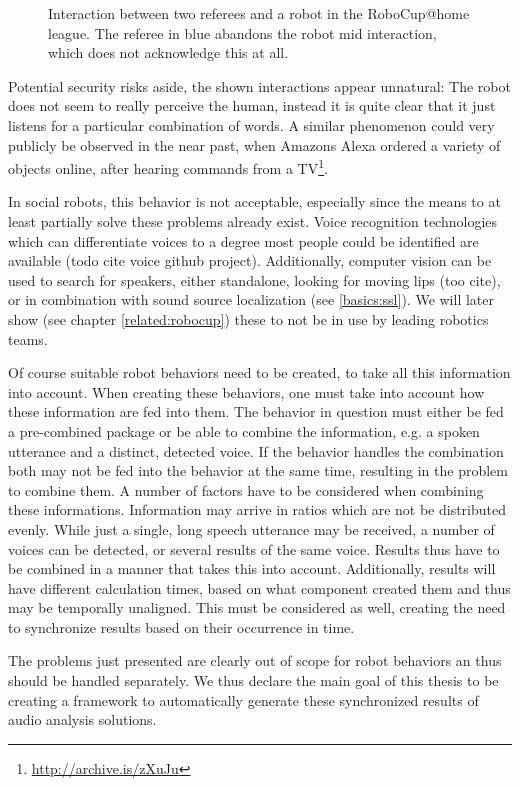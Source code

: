 \begin{figure}[]
	\caption{Interaction between two referees and a robot in the RoboCup@home league.
		The referee in blue abandons the robot mid interaction, which does not acknowledge this at all.}
	\label{pic:moti:imustgonow}
\end{figure}

Potential security risks aside, the shown interactions appear unnatural:
The robot does not seem to really perceive the human, instead it is quite clear that it just listens for a particular combination of words.
A similar phenomenon could very publicly be observed in the near past, when Amazons Alexa ordered a variety of objects online, after hearing commands from a  TV\footnote{\url{http://archive.is/zXuJu}}.

In social robots, this behavior is not acceptable, especially since the means to at least partially solve these problems already exist.
Voice recognition technologies which can differentiate voices to a degree most people could be identified are available (todo cite voice github project).
Additionally, computer vision can be used to search for speakers, either standalone, looking for moving lips (too cite), or in combination with sound source localization (see \ref{basics:ssl}).
We will later show (see chapter \ref{related:robocup}) these to not be in use by leading robotics teams.

Of course suitable robot behaviors need to be created, to take all this information into account.
When creating these behaviors, one must take into account how these information are fed into them.
The behavior in question must either be fed a pre-combined package or be able to combine the information, e.g. a spoken utterance and a distinct, detected voice.
If the behavior handles the combination both may not be fed into the behavior at the same time, resulting in the problem to combine them.
A number of factors have to be considered when combining these informations.
Information may arrive in ratios which are not be distributed evenly.
While just a single, long speech utterance may be received, a number of voices can be detected, or several results of the same voice.
Results thus have to be combined in a manner that takes this into account.
Additionally, results will have different calculation times, based on what component created them and thus may be temporally unaligned.
This must be considered as well, creating the need to synchronize results based on their occurrence in time.

The problems just presented are clearly out of scope for robot behaviors an thus should be handled separately.
We thus declare the main goal of this thesis to be creating a framework to automatically generate these synchronized results of audio analysis solutions.


